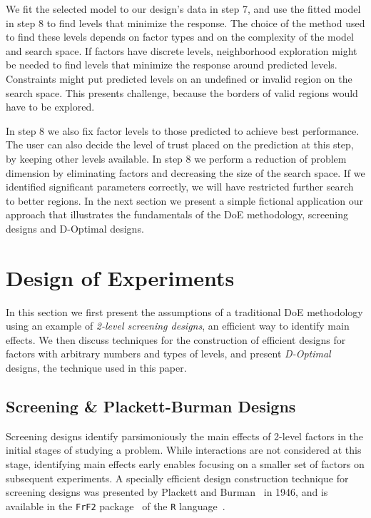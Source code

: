 \documentclass[conference]{IEEEtran}
\begin{document}
We fit  the selected model to  our design's data in  step 7, and use  the fitted
model in  step 8 to find  levels that minimize  the response. The choice  of the
method used to find  these levels depends on factor types  and on the complexity
of the  model and search  space. If  factors have discrete  levels, neighborhood
exploration might  be needed to  find levels  that minimize the  response around
predicted  levels. Constraints  might put  predicted levels  on an  undefined or
invalid region on the search space. This presents challenge, because the borders
of valid regions would have to be explored.

In  step  8 we  also  fix  factor levels  to  those  predicted to  achieve  best
performance.  The  user  can also  decide  the  level  of  trust placed  on  the
prediction at this step, by keeping other levels available. In step 8 we perform
a reduction of problem dimension by  eliminating factors and decreasing the size
of the search space. If we  identified significant parameters correctly, we will
have restricted further search to better regions. In the next section we present
a simple fictional application our approach that illustrates the fundamentals of
the DoE methodology, screening designs and D-Optimal designs.
\section{Design of Experiments}
\label{sec:org44820b0}
In  this  section  we  first  present  the  assumptions  of  a  traditional  DoE
methodology using an  example of \emph{2-level screening designs}, an  efficient way to
identify  main effects.  We  then  discuss techniques  for  the construction  of
efficient designs  for factors with arbitrary  numbers and types of  levels, and
present \emph{D-Optimal} designs, the technique used in this paper.
\subsection{Screening \& Plackett-Burman Designs}
\label{sec:org38ebf81}
Screening designs identify parsimoniously the main effects of 2-level factors in
the initial stages of studying a  problem. While interactions are not considered
at this stage, identifying main effects  early enables focusing on a smaller set
of factors on subsequent experiments.  A specially efficient design construction
technique   for    screening   designs    was   presented   by    Plackett   and
Burman~\cite{plackett1946design}  in   1946,  and  is  available   in  the  \texttt{FrF2}
package~\cite{gromping2014frf2} of the \texttt{R} language~\cite{team2018rlanguage}.
\end{document}
